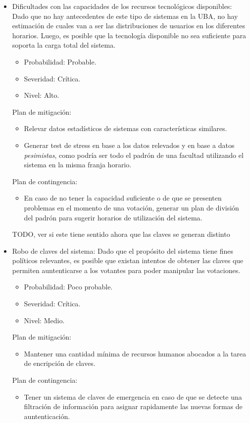 \begin{itemize}
\bigskip

\item Dificultades con las capacidades de los recursos tecnol\'ogicos disponibles: Dado que no hay antecedentes de este tipo de sistemas en la UBA, no hay estimaci\'on de cuales van a ser las distribuciones de usuarios en los diferentes horarios. Luego, es posible que la tecnolog\'ia disponible no sea suficiente para soporta la carga total del sistema.
\begin{itemize}
\item Probabilidad: Probable.
\item Severidad: Cr\'itica.
\item Nivel: Alto.
\end{itemize}
\medskip
Plan de mitigación:
\begin{itemize}
\item Relevar datos estad\'isticos de sistemas con caracter\'isticas similares.
\item Generar test de stress en base a los datos relevados y en base a datos \emph{pesimistas}, como podr\'ia ser todo el padr\'on de una facultad utilizando el sistema en la misma franja horario.
\end{itemize}
\medskip
Plan de contingencia:
\begin{itemize}
\item En caso de no tener la capacidad suficiente o de que se presenten problemas en el momento de una votaci\'on, generar un plan de divisi\'on del padr\'on para sugerir horarios de utilizaci\'on del sistema.
\end{itemize}

\bigskip



TODO, ver si este tiene sentido ahora que las claves se generan distinto
\item Robo de claves del sistema: Dado que el prop\'osito del sistema tiene fines pol\'iticos relevantes, es posible que existan intentos de obtener las claves que permiten auntenticarse a los votantes para poder manipular las votaciones.
\begin{itemize}
\item Probabilidad: Poco probable.
\item Severidad: Cr\'itica.
\item Nivel: Medio.
\end{itemize}
\medskip
Plan de mitigación:
\begin{itemize}
\item Mantener una cantidad m\'inima de recursos humanos abocados a la tarea de encripción de claves.
\end{itemize}
\medskip
Plan de contingencia:
\begin{itemize}
\item Tener un sistema de claves de emergencia en caso de que se detecte una filtraci\'on de informaci\'on para asignar rapidamente las nuevas formas de auntenticaci\'on.
\end{itemize}




\end{itemize}

